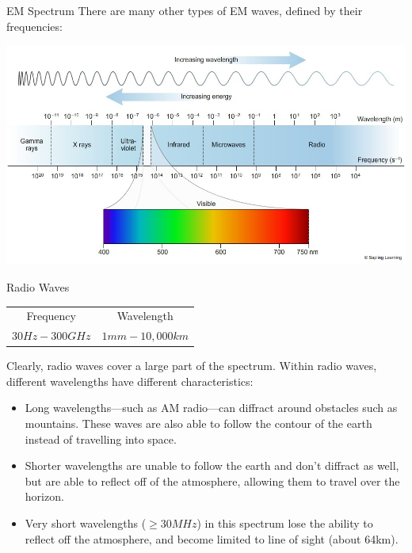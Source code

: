 \documentclass{beamer}
\begin{document}
\begin{frame}{EM Spectrum}
    There are many other types of EM waves, defined by their frequencies:

    \includegraphics[scale=.3]{emspectrum.jpg}
    
\end{frame}

\begin{frame}{Radio Waves}
	\begin{center}
	\begin{tabular}{c c}
		Frequency & Wavelength \\
		$30 Hz - 300 GHz$ & $1 mm - 10,000 km$ \\	
	\end{tabular}
	\end{center}
	Clearly, radio waves cover a large part of the spectrum. Within radio waves, different wavelengths have different characteristics:
	\begin{itemize}
		\item Long wavelengths---such as AM radio---can diffract around obstacles such as mountains. These waves are also able to follow the contour of the earth instead of travelling into space. 
		\item Shorter wavelengths are unable to follow the earth and don't diffract as well, but are able to reflect off of the atmosphere, allowing them to travel over the horizon.
		\item Very short wavelengths ($\geq 30 MHz$) in this spectrum lose the ability to reflect off the atmosphere, and become limited to \alert{line of sight} (about 64km).  
	\end{itemize}
\end{frame}
\end{document}
